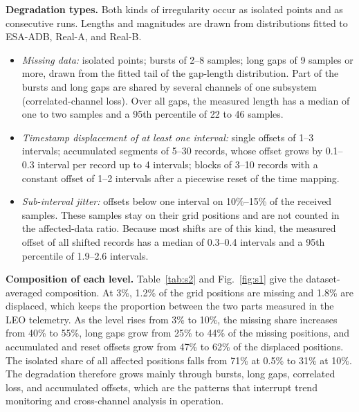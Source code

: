 \documentclass[10pt,a4paper]{article}
\begin{document}
\textbf{Degradation types.} Both kinds of irregularity occur as isolated points and as consecutive runs. Lengths and magnitudes are drawn from distributions fitted to ESA-ADB, Real-A, and Real-B.
\begin{itemize}
\item \textit{Missing data:} isolated points; bursts of 2--8 samples; long gaps of 9 samples or more, drawn from the fitted tail of the gap-length distribution. Part of the bursts and long gaps are shared by several channels of one subsystem (correlated-channel loss). Over all gaps, the measured length has a median of one to two samples and a 95th percentile of 22 to 46 samples.
\item \textit{Timestamp displacement of at least one interval:} single offsets of 1--3 intervals; accumulated segments of 5--30 records, whose offset grows by 0.1--0.3 interval per record up to 4 intervals; blocks of 3--10 records with a constant offset of 1--2 intervals after a piecewise reset of the time mapping.
\item \textit{Sub-interval jitter:} offsets below one interval on 10\%--15\% of the received samples. These samples stay on their grid positions and are not counted in the affected-data ratio. Because most shifts are of this kind, the measured offset of all shifted records has a median of 0.3--0.4 intervals and a 95th percentile of 1.9--2.6 intervals.
\end{itemize}

\textbf{Composition of each level.} Table~\ref{tab:s2} and Fig.~\ref{fig:s1} give the dataset-averaged composition. At 3\%, 1.2\% of the grid positions are missing and 1.8\% are displaced, which keeps the proportion between the two parts measured in the LEO telemetry. As the level rises from 3\% to 10\%, the missing share increases from 40\% to 55\%, long gaps grow from 25\% to 44\% of the missing positions, and accumulated and reset offsets grow from 47\% to 62\% of the displaced positions. The isolated share of all affected positions falls from 71\% at 0.5\% to 31\% at 10\%. The degradation therefore grows mainly through bursts, long gaps, correlated loss, and accumulated offsets, which are the patterns that interrupt trend monitoring and cross-channel analysis in operation.
\end{document}
